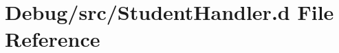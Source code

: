 \hypertarget{_student_handler_8d}{}\section{Debug/src/\+Student\+Handler.d File Reference}
\label{_student_handler_8d}
